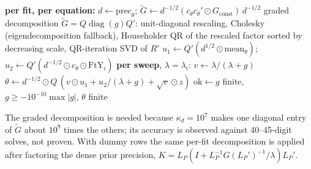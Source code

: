 \begin{algorithm}[!htbp]
\caption{Graded eigen fast path for Mode I $\times$ Constant (,
). $G_{\mathrm{const}}$ is the time-constant Gram and $\mathrm{FtY}_i = F'y_i$.}
\label{alg:C-eigen}
\footnotesize
\begin{algorithmic}[1]
\Statex \textbf{per fit, per equation:}
\State $d \gets \mathrm{prec}_\theta$; $\tilde G \gets d^{-1/2}(c_\theta c_\theta' \odot G_{\mathrm{const}})\,d^{-1/2}$
\State graded decomposition $\tilde G = Q\operatorname{diag}(g)Q'$: unit-diagonal rescaling, Cholesky (eigendecomposition fallback), Householder QR of the rescaled factor sorted by decreasing scale, QR-iteration SVD of $R'$
\State $u_1 \gets Q'(d^{1/2}\odot\mathrm{mean}_\theta)$; $u_2 \gets Q'(d^{-1/2}\odot c_\theta\odot\mathrm{FtY}_i)$
\Statex \textbf{per sweep}, $\lambda = \lambda_i$:
\State $v \gets \lambda/(\lambda + g)$ 
\State $\theta \gets d^{-1/2}\odot Q\,(v\odot u_1 + u_2/(\lambda + g) + \sqrt{v}\odot z)$ 
\State $\mathrm{ok} \gets g$ finite, $g \ge -10^{-10}\max|g|$, $\theta$ finite
\end{algorithmic}
\end{algorithm}

The graded decomposition is needed because $\kappa_d = 10^7$ makes one diagonal entry of $\tilde
G$ about $10^9$ times the others; its accuracy is observed against 40--45-digit solves, not proven.
With dummy rows the same per-fit decomposition is applied after factoring the dense prior precision,
$K = L_P(I + L_P^{-1}G(L_P')^{-1}/\lambda)L_P'$.

